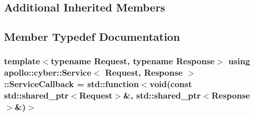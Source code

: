 \subsection*{Additional Inherited Members}


\subsection{Member Typedef Documentation}
\hypertarget{classapollo_1_1cyber_1_1Service_aedd53fb1d4b3636253ddcaba4dc896ab}{
\subsubsection[{Service\-Callback}]{\setlength{\rightskip}{0pt plus 5cm}template$<$typename Request, typename Response$>$ using {\bf apollo\-::cyber\-::\-Service}$<$ Request, Response $>$\-::{\bf Service\-Callback} =  std\-::function$<$void(const std\-::shared\-\_\-ptr$<$Request$>$\&, std\-::shared\-\_\-ptr$<$Response$>$\&)$>$}}\label{classapollo_1_1cyber_1_1Service_aedd53fb1d4b3636253ddcaba4dc896ab}


